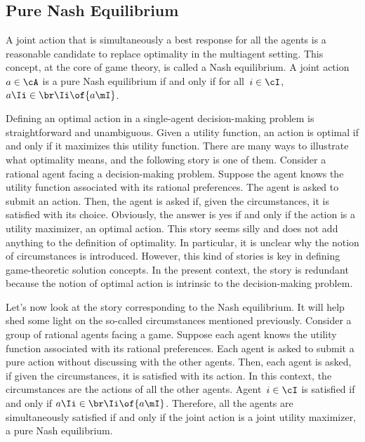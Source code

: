 \subsection{Pure Nash Equilibrium}

A joint action that is simultaneously a best response for all the agents is a reasonable candidate to replace optimality in the multiagent setting.
This concept, at the core of game theory, is called a Nash equilibrium.
A joint action~\(a \in \cA\) is a pure Nash equilibrium if and only if for all~\(i \in \cI\), \(a\Ii \in \br\Ii \of {a\mI}\).

Defining an optimal action in a single-agent decision-making problem is straightforward and unambiguous.
Given a utility function, an action is optimal if and only if it maximizes this utility function.
There are many ways to illustrate what optimality means, and the following story is one of them.
Consider a rational agent facing a decision-making problem.
Suppose the agent knows the utility function associated with its rational preferences.
The agent is asked to submit an action.
Then, the agent is asked if, given the circumstances, it is satisfied with its choice.
Obviously, the answer is yes if and only if the action is a utility maximizer, \ie an optimal action.
This story seems silly and does not add anything to the definition of optimality.
In particular, it is unclear why the notion of circumstances is introduced.
However, this kind of stories is key in defining game-theoretic solution concepts.
In the present context, the story is redundant because the notion of optimal action is intrinsic to the decision-making problem.

Let's now look at the story corresponding to the Nash equilibrium.
It will help shed some light on the so-called circumstances mentioned previously.
Consider a group of rational agents facing a game.
Suppose each agent knows the utility function associated with its rational preferences.
Each agent is asked to submit a pure action without discussing with the other agents.
Then, each agent is asked, if given the circumstances, it is satisfied with its action.
In this context, the circumstances are the actions of all the other agents.
Agent~\(i \in \cI\) is satisfied if and only if \(a\Ii \in \br\Ii \of {a\mI}\).
Therefore, all the agents are simultaneously satisfied if and only if the joint action is a joint utility maximizer, \ie a pure Nash equilibrium.


